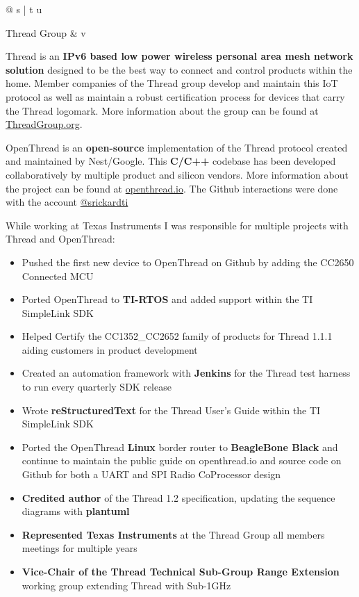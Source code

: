 \documentclass[a4paper,10pt]{article}
\begin{document}
\begin{tabular*}{\textwidth}{@{\extracolsep{\fill}} s | t u}

  Thread Group &  {v} {
    Thread is an \textbf{IPv6 based low power wireless personal area mesh network solution} designed
    to be the best way to connect and control products within the home. Member companies of the
    Thread group develop and maintain this IoT protocol as well as maintain a robust certification
    process for devices that carry the Thread logomark. More information about the group can be
    found at \href{https://www.threadgroup.org/}{ThreadGroup.org}.

    OpenThread is an \textbf{open-source} implementation of the Thread protocol created and
    maintained by Nest/Google. This \textbf{C/C++} codebase has been developed collaboratively by
    multiple product and silicon vendors. More information about the project can be found at
    \href{https://openthread.io/}{openthread.io}. The Github interactions were done with the account
    \href{https://github.com/srickardti}{@srickardti}

    While working at Texas Instruments I was responsible for multiple projects with Thread and
    OpenThread:

    \begin{itemize}[nosep, leftmargin=1em]

      \item Pushed the first new device to OpenThread on Github by adding the CC2650 Connected MCU
      \item Ported OpenThread to \textbf{TI-RTOS} and added support within the TI SimpleLink SDK
      \item Helped Certify the CC1352\_CC2652 family of products for Thread 1.1.1 aiding customers
            in product development
      \item Created an automation framework with \textbf{Jenkins} for the Thread test harness to run
            every quarterly SDK release
      \item Wrote \textbf{reStructuredText} for the Thread User's Guide within the TI SimpleLink SDK
      \item Ported the OpenThread \textbf{Linux} border router to \textbf{BeagleBone Black} and
            continue to maintain the public guide on openthread.io and source code on Github for
            both a UART and SPI Radio CoProcessor design
      \item \textbf{Credited author} of the Thread 1.2 specification, updating the sequence diagrams
            with \textbf{plantuml}
      \item \textbf{Represented Texas Instruments} at the Thread Group all members meetings for
            multiple years
      \item \textbf{Vice-Chair of the Thread Technical Sub-Group Range Extension} working group
            extending Thread with Sub-1GHz


\end{itemize}}
\end{tabular*}
\end{document}
